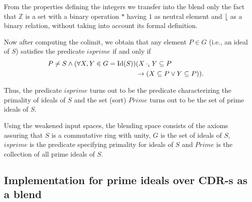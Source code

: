 From the properties defining the integers we
transfer into the blend only the fact that $\mathbb{Z}$ is a set with
a binary operation $*$ having $1$ as neutral element and
$\lfloor$ as a binary relation, without taking into account its formal definition.


Now after computing the colimit, we obtain that
any element $P \in G$
(i.e., an ideal of $S$) satisfies the predicate $isprime$ if and only
if
\begin{align*}
P\neq S \wedge (\forall X,Y\in G={\rm Id}(S)) & (X\cdot_{\iota}Y\subseteq P\\
                             & \rightarrow (X\subseteq P \vee Y\subseteq P)).
\end{align*}

Thus, the predicate $isprime$ turns out to be the
predicate characterizing the primality of ideals of $S$ and the set
(sort) $Prime$ turns out to be the set of prime ideals of $S$.


Using the weakened input spaces, the blending space consists of the
axioms assuring that $S$ is a commutative ring with unity, $G$ is the
set of ideals of $S$, $isprime$ is the predicate specifying primality
for ideals of $S$ and $Prime$ is the collection of all prime ideals of
$S$.


\subsection{Implementation for prime ideals over CDR-s as a blend}\label{implementation}

